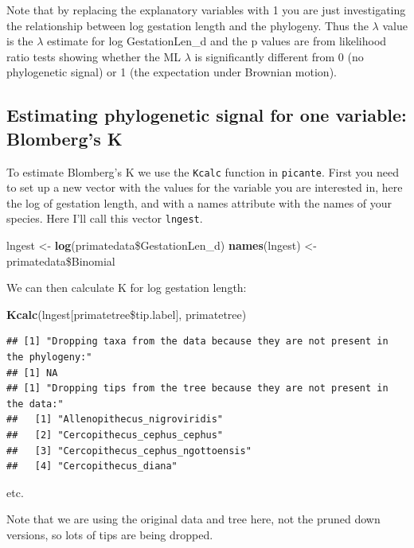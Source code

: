 \documentclass[12pt]{article}
\newcommand{\KeywordTok}[1]{\textcolor[rgb]{0.13,0.29,0.53}{\textbf{{#1}}}}
\newcommand{\StringTok}[1]{\textcolor[rgb]{0.31,0.60,0.02}{{#1}}}
\newcommand{\NormalTok}[1]{{#1}}
\begin{document}
Note that by replacing the explanatory variables with 1 you are just investigating the relationship between log gestation length and the phylogeny. Thus the $\lambda$ value is the $\lambda$ estimate for log GestationLen\_d and the p values are from likelihood ratio tests showing whether the ML $\lambda$ is significantly different from 0 (no phylogenetic signal) or 1 (the expectation under Brownian motion).

\subsection{Estimating phylogenetic signal for one variable: Blomberg's K}

To estimate Blomberg’s K we use the \texttt{Kcalc} function in \texttt{picante}. First you need to set up a new vector with the values for the variable you are interested in, here the log of gestation length, and with a names attribute with the names of your species. Here I'll call this vector \texttt{lngest}.

\begin{snugshade}
\begin{Highlighting}[]
\NormalTok{lngest <-}\StringTok{ }\KeywordTok{log}\NormalTok{(primatedata\$GestationLen_d)}
\KeywordTok{names}\NormalTok{(lngest) <-}\StringTok{ }\NormalTok{primatedata\$Binomial}
\end{Highlighting}
\end{snugshade}

We can then calculate K for log gestation length:

\begin{snugshade}
\begin{Highlighting}[]
\KeywordTok{Kcalc}\NormalTok{(lngest[primatetree\$tip.label], primatetree)}
\end{Highlighting}
\end{snugshade}

\begin{verbatim}
## [1] "Dropping taxa from the data because they are not present in the phylogeny:"
## [1] NA
## [1] "Dropping tips from the tree because they are not present in the data:"
##   [1] "Allenopithecus_nigroviridis"                  
##   [2] "Cercopithecus_cephus_cephus"                  
##   [3] "Cercopithecus_cephus_ngottoensis"             
##   [4] "Cercopithecus_diana"
\end{verbatim}

etc.

Note that we are using the original data and tree here, not the pruned down versions, so lots of tips are being dropped.
\end{document}
